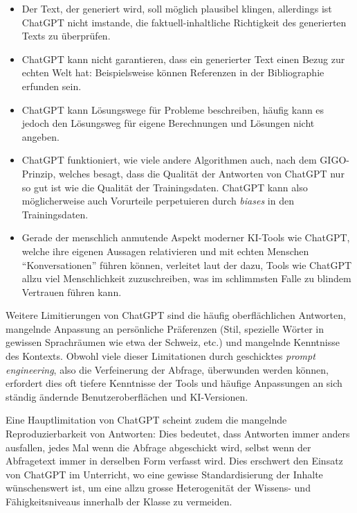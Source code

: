 \begin{itemize}
    \item Der Text, der generiert wird, soll möglich plausibel klingen, allerdings ist ChatGPT nicht imstande, die faktuell-inhaltliche Richtigkeit des generierten Texts zu überprüfen.
    \item ChatGPT kann nicht garantieren, dass ein generierter Text einen Bezug zur echten Welt hat: Beispielsweise können Referenzen in der Bibliographie erfunden sein.
    \item ChatGPT kann Lösungswege für Probleme beschreiben, häufig kann es jedoch den Lösungsweg für eigene Berechnungen und Lösungen nicht angeben.
    \item ChatGPT funktioniert, wie viele andere Algorithmen auch, nach dem \gls{GIGO}-Prinzip, welches besagt, dass die Qualität der Antworten von ChatGPT nur so gut ist wie die Qualität der Trainingsdaten. ChatGPT kann also möglicherweise auch Vorurteile perpetuieren durch \textit{biases} in den Trainingsdaten.
    \item Gerade der menschlich anmutende Aspekt moderner \gls{KI}-Tools wie ChatGPT, welche ihre eigenen Aussagen relativieren und mit echten Menschen \enquote{Konversationen} führen können, verleitet laut der \textcite{bfh} dazu, Tools wie ChatGPT allzu viel Menschlichkeit zuzuschreiben, was im schlimmsten Falle zu blindem Vertrauen führen kann.
\end{itemize}

Weitere Limitierungen von ChatGPT sind die häufig oberflächlichen Antworten, mangelnde Anpassung an persönliche Präferenzen (Stil, spezielle Wörter in gewissen Sprachräumen wie etwa der Schweiz, etc.) und mangelnde Kenntnisse des Kontexts. Obwohl viele dieser Limitationen durch geschicktes \textit{prompt engineering}, also die Verfeinerung der Abfrage, überwunden werden können, erfordert dies oft tiefere Kenntnisse der Tools und häufige Anpassungen an sich ständig ändernde Benutzeroberflächen und \gls{KI}-Versionen.

Eine Hauptlimitation von ChatGPT scheint zudem die mangelnde Reproduzierbarkeit von Antworten: Dies bedeutet, dass Antworten immer anders ausfallen, jedes Mal wenn die Abfrage abgeschickt wird, selbst wenn der Abfragetext immer in derselben Form verfasst wird. Dies erschwert den Einsatz von ChatGPT im Unterricht, wo eine gewisse Standardisierung der Inhalte wünschenswert ist, um eine allzu grosse Heterogenität der Wissens- und Fähigkeitsniveaus innerhalb der Klasse zu vermeiden.

